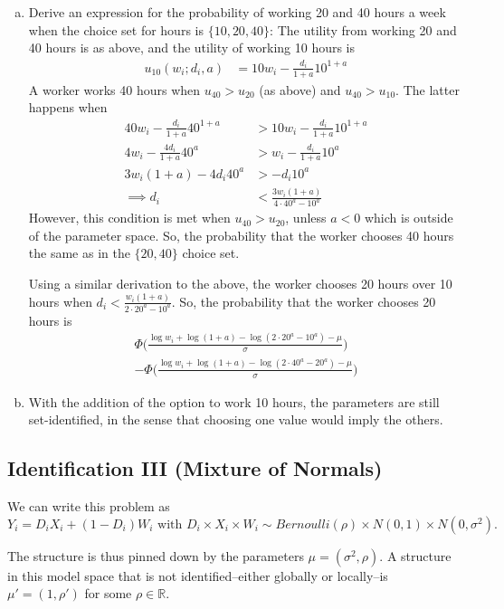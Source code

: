 \documentclass[11pt]{article}
\begin{document}
\begin{enumerate}[a)]
	\item Derive an expression for the probability of working 20 and 40 hours a week when the choice set for hours is $\{ 10,20,40 \}$: The utility from working 20 and 40 hours is as above, and the utility of working 10 hours is
	\begin{align*}
		u_{10}(w_i;d_i,a) &= 10 w_i - \frac{d_i}{1+a} 10^{1+a}
	\end{align*}
	A worker works 40 hours when $u_{40} > u_{20}$ (as above) and $u_{40} > u_{10}$. The latter happens when
	\begin{align*}
		40 w_i - \frac{d_i}{1+a} 40^{1+a} &> 10 w_i - \frac{d_i}{1+a} 10^{1+a} \\
		4 w_i - \frac{4d_i}{1+a} 40^{a} &> w_i - \frac{d_i}{1+a} 10^{a} \\
		3 w_i (1+a) - 4d_i 40^{a} &> - d_i 10^{a} \\
		\implies d_i &< \frac{3w_i(1+a)}{4 \cdot 40^a - 10^a}
	\end{align*}
	However, this condition is met when $u_{40} > u_{20}$, unless $a < 0$ which is outside of the parameter space. So, the probability that the worker chooses 40 hours the same as in the $\{20,40\}$ choice set.

	Using a similar derivation to the above, the worker chooses 20 hours over 10 hours when $d_i < \frac{w_i (1+a)}{2 \cdot 20^a - 10^a}$. So, the probability that the worker chooses 20 hours is
	\begin{align*}
		\Phi \bigg( \frac{\log w_i + \log (1+a) - \log(2 \cdot 20^a - 10^a) - \mu}{\sigma} \bigg)  \\ - \Phi \bigg( \frac{\log w_i + \log (1+a) - \log(2 \cdot 40^a - 20^a) - \mu}{\sigma} \bigg)
	\end{align*}
	
	\item With the addition of the option to work 10 hours, the parameters are still set-identified, in the sense that choosing one value would imply the others.

\end{enumerate}

\subsection*{Identification III (Mixture of Normals)}
We can write this problem as 
$$Y_i = D_i X_i + (1-D_i)W_i \text{ with } D_i \times X_i \times W_i \sim Bernoulli(\rho) \times N(0,1) \times N(0,\sigma^2).$$ 

The structure is thus pinned down by the parameters $\mu = (\sigma^2,\rho)$. A structure in this model space that is not identified--either globally or locally--is $\mu' = (1,\rho')$ for some $\rho \in \mathbb{R}$.
\end{document}
